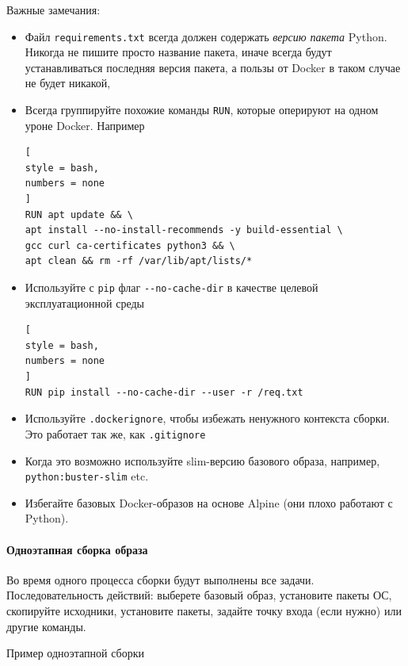 \documentclass[%
	11pt,
	a4paper,
	utf8,
		]{article}
\begin{document}
Важные замечания:
\begin{itemize}
	\item Файл \texttt{requirements.txt} всегда должен содержать \emph{версию пакета} Python. Никогда не пишите просто название пакета, иначе всегда будут устанавливаться последняя версия пакета, а пользы от Docker в таком случае не будет никакой,
	
	\item Всегда группируйте похожие команды \texttt{RUN}, которые оперируют на одном уроне Docker. Например
\begin{lstlisting}[
style = bash,
numbers = none	
]
RUN apt update && \
apt install --no-install-recommends -y build-essential \
gcc curl ca-certificates python3 && \
apt clean && rm -rf /var/lib/apt/lists/*
\end{lstlisting}

   \item Используйте с \texttt{pip} флаг \verb|--no-cache-dir| в качестве целевой эксплуатационной среды
\begin{lstlisting}[
style = bash,
numbers = none	
]
RUN pip install --no-cache-dir --user -r /req.txt
\end{lstlisting}

    \item Используйте \texttt{.dockerignore}, чтобы избежать ненужного контекста сборки. Это работает так же, как \texttt{.gitignore}
    
    \item Когда это возможно используйте slim-версию базового образа, например, \texttt{python:buster-slim} etc.
    
    \item Избегайте базовых Docker-образов на основе Alpine (они плохо работают с Python).
\end{itemize}

\paragraph{Одноэтапная сборка образа}

Во время одного процесса сборки будут выполнены все задачи. Последовательность действий: выберете базовый образ, установите пакеты ОС, скопируйте исходники, установите пакеты, задайте точку входа (если нужно) или другие команды.

Пример одноэтапной сборки
\end{document}
